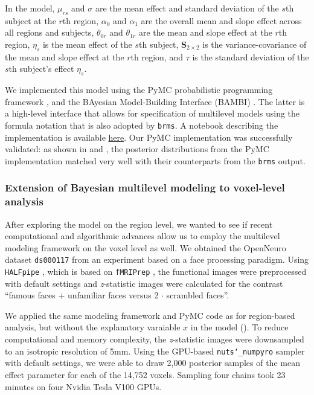 \documentclass[../main.tex]{subfiles}
\begin{document}
\noindent
In the model, $\mu_{rs}$ and $\sigma$ are the mean effect and standard deviation of the $s$th subject at the $r$th region, $\alpha_0$ and $\alpha_1$ are the overall mean and slope effect across all regions and subjects, $\theta_{0r}$ and $\theta_{1r}$ are the mean and slope effect at the $r$th region, $\eta_s$ is the mean effect of the $s$th subject, $\boldsymbol{S}_{2\times 2}$ is the variance-covariance of the mean and slope effect at the $r$th region, and $\tau$ is the standard deviation of the $s$th subject's effect $\eta_s$.%

We implemented this model using the PyMC probabilistic programming framework  \parencite{Salvatier2016}, and the BAyesian Model-Building Interface (BAMBI)  \parencite{capretto2020}. The latter is a high-level interface that allows for specification of multilevel models using the formula notation that is also adopted by \texttt{brms}. A notebook describing the implementation is available \href{https://github.com/crnolan/pyrba}{here}. Our PyMC implementation was successfully validated: as shown in  and ,  the posterior distributions from the PyMC implementation matched very well with their counterparts from the \texttt{brms} output.%

\subsubsection{Extension of Bayesian multilevel modeling to voxel-level analysis}

After exploring the model on the region level, we wanted to see if recent computational and algorithmic advances allow us to employ the multilevel modeling framework on the voxel level as well. We obtained the OpenNeuro dataset \texttt{ds000117} \parencite{wakeman_multi-subject_2015} from an experiment based on  a face processing paradigm. Using \texttt{HALFpipe} \parencite{waller_enigma_2022}, which is based on \texttt{fMRIPrep} \parencite{esteban_fmriprep_2019}, the functional images were preprocessed with default settings and \emph{z}-statistic images were calculated for the contrast ``famous faces + unfamiliar faces versus 2 $\cdot$ scrambled faces''. 

We applied the same modeling framework and PyMC code as for region-based analysis, but without the explanatory varaiable $x$ in the model (). To reduce computational and memory complexity, the \emph{z}-statistic images were downsampled to an isotropic resolution of 5mm. Using the GPU-based \texttt{nuts\char`_numpyro} sampler \parencite{phan_composable_2019} with default settings, we were able to draw 2,000 posterior samples of the mean effect parameter for each of the 14,752 voxels. Sampling four chains took 23 minutes on four Nvidia Tesla V100 GPUs.
\end{document}
